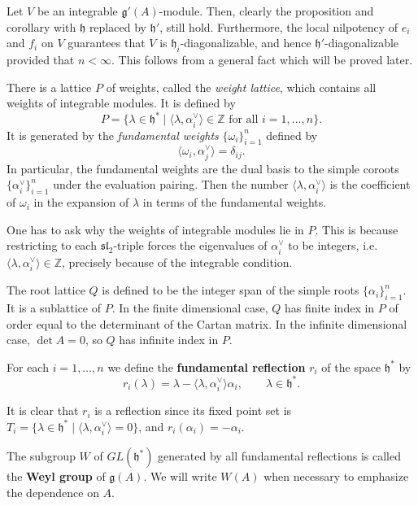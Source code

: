 \documentclass[12pt]{article}
\begin{document}
\begin{remark}
Let $V$ be an integrable $\mathfrak{g}'(A)$-module. Then, clearly the proposition and corollary with $\mathfrak{h}$ replaced by $\mathfrak{h}'$, still hold. Furthermore, the local nilpotency of $e_i$ and $f_i$ on $V$ 
guarantees that $V$ is $\mathfrak{h}_i$-diagonalizable, and hence $\mathfrak{h}'$-diagonalizable provided that $n<\infty$. 
This follows from a general fact which will be proved later.
\end{remark}


\begin{remark}
    
There is a lattice $P$ of weights, called the \emph{weight lattice}, which contains all weights of integrable modules. It is defined by
\[    P = \{\lambda \in \mathfrak{h}^* \mid \langle \lambda, \alpha_i^\vee \rangle \in \mathbb{Z} \text{ for all } i=1,\dots,n\}.
\]
It is generated by the \emph{fundamental weights} $\{\omega_i\}_{i=1}^n$ defined by
\[    \langle \omega_i, \alpha_j^\vee \rangle = \delta_{ij}.
\] In particular, the fundamental weights are the dual basis to the simple coroots $\{\alpha_i^\vee\}_{i=1}^n$ under the evaluation pairing. Then the number $\langle \lambda, \alpha_i^\vee \rangle$ is the coefficient of $\omega_i$ in the expansion of $\lambda$ in terms of the fundamental weights.

One has to ask why the weights of integrable modules lie in $P$. This is because restricting to each $\mathfrak{sl}_2$-triple forces the eigenvalues of $\alpha_i^\vee$ to be integers, i.e. $\langle \lambda,\alpha_i^\vee\rangle \in \mathbb{Z}$, precisely because of the integrable condition.

The root lattice $Q$ is defined to be the integer span of the simple roots $\{\alpha_i\}_{i=1}^n$. It is a sublattice of $P$. In the finite dimensional case, $Q$ has finite index in $P$ of order equal to the determinant of the Cartan matrix. In the infinite dimensional case, $\det A = 0$, so $Q$ has infinite index in $P$.
\end{remark}

\begin{definition}
    For each $i=1,\dots,n$ we define the 
\textbf{fundamental reflection} $r_i$ of the space $\mathfrak{h}^*$ by
\[
   r_i(\lambda) = \lambda - \langle \lambda,\alpha_i^\vee\rangle \alpha_i,
   \qquad \lambda \in \mathfrak{h}^*.
\]

It is clear that $r_i$ is a reflection since its fixed point set is  $T_i = \{ \lambda \in \mathfrak{h}^* \mid \langle \lambda,\alpha_i^\vee\rangle=0\}$,
and $r_i(\alpha_i) = -\alpha_i$.

The subgroup $W$ of $GL(\mathfrak{h}^*)$ generated by all fundamental reflections 
is called the \textbf{Weyl group} of $\mathfrak{g}(A)$. We will write $W(A)$ when 
necessary to emphasize the dependence on $A$.
\end{definition}
\end{document}
